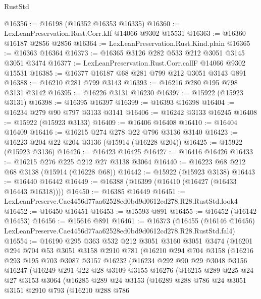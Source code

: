 \begin{lexlean}{RustStd}
\begin{coremodule}
@16356 := @16198 (@16352 @16353 @16335)
@16360 := LexLeanPreservation.Rust.Corr.kIf @14066 @9302 @15531
@16363 := @16360 @16187 @2856 @2856
@16364 := LexLeanPreservation.Rust.Kind.plain
@16365 := @16363 @16364
@16373 := @16365 @3126 @282 @533 @212 @3051 @3145 @3051 @3474
@16377 := LexLeanPreservation.Rust.Corr.callF @14066 @9302 @15531
@16385 := @16377 @16187 @68 @281 @799 @212 @3051 @3143 @891
@16388 := @16210 @281 @799 @3143
@16393 := @16216 @280 @195 @798 @3131 @3142
@16395 := @16226 @3131 @16230
@16397 := @15922 (@15923 @3131)
@16398 := @16395 @16397
@16399 := @16393 @16398
@16404 := @16234 @279 @90 @797 @3133 @3141
@16406 := @16242 @3133 @16245
@16408 := @15922 (@15923 @3133)
@16409 := @16406 @16408
@16410 := @16404 @16409
@16416 := @16215 @274 @278 @22 @796 @3136 @3140
@16423 := @16223 @204 @22 @204 @3136 (@15914 (@16228 @204))
@16425 := @15922 (@15923 @3136)
@16426 := @16423 @16425
@16427 := @16416 @16426
@16433 := @16215 @276 @225 @212 @27 @3138 @3064
@16440 := @16223 @68 @212 @68 @3138 (@15914 (@16228 @68))
@16442 := @15922 (@15923 @3138)
@16443 := @16440 @16442
@16449 := @16388 (@16399 (@16410 (@16427 (@16433 @16443 @16318))))
@16450 := @16385 @16449
@16451 := LexLeanPreserve.Cae4456d77aa62528ed0bd9d0612cd278.R28.RustStd.look4
@16452 := @16450 @16451
@16453 := @15593 @891
@16455 := @16452 (@16142 @16453)
@16456 := @15616 @891
@16461 := @16373
    (@16455 (@16146 @16456) LexLeanPreserve.Cae4456d77aa62528ed0bd9d0612cd278.R28.RustStd.fal4)
@16554 := @16190
    @295
    @363
    @532
    @212
    @3051
    @3160
    @3051
    @3474
    (@16201
      @294
      @704
      @53
      @3051
      @3158
      @2910
      @781
      (@16210
        @294
        @704
        @3158
        (@16216
          @293
          @195
          @703
          @3087
          @3157
          @16232
          (@16234
            @292
            @90
            @29
            @3048
            @3156
            @16247
            (@16249
              @291
              @22
              @28
              @3109
              @3155
              @16276
              (@16215
                @289
                @225
                @24
                @27
                @3153
                @3064
                (@16285
                  @289
                  @24
                  @3153
                  (@16289
                    @288
                    @786
                    @24
                    @3051
                    @3151
                    @2910
                    @793
                    (@16210
                      @288
                      @786

\end{coremodule}
\end{lexlean}
